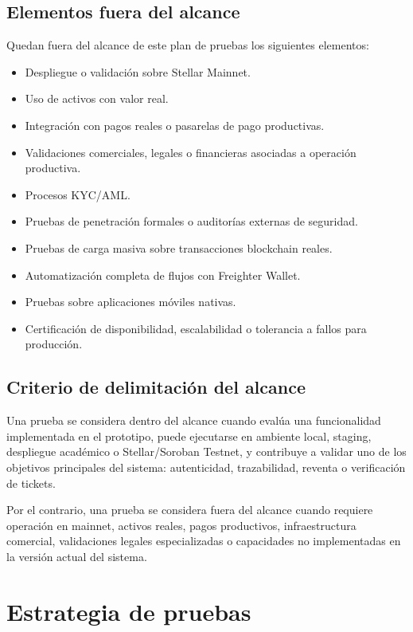 \documentclass[12pt,letterpaper]{article}
\begin{document}
\subsection{Elementos fuera del alcance}

Quedan fuera del alcance de este plan de pruebas los siguientes elementos:

\begin{itemize}
    \item Despliegue o validación sobre Stellar Mainnet.
    \item Uso de activos con valor real.
    \item Integración con pagos reales o pasarelas de pago productivas.
    \item Validaciones comerciales, legales o financieras asociadas a operación productiva.
    \item Procesos KYC/AML.
    \item Pruebas de penetración formales o auditorías externas de seguridad.
    \item Pruebas de carga masiva sobre transacciones blockchain reales.
    \item Automatización completa de flujos con Freighter Wallet.
    \item Pruebas sobre aplicaciones móviles nativas.
    \item Certificación de disponibilidad, escalabilidad o tolerancia a fallos para producción.
\end{itemize}

\subsection{Criterio de delimitación del alcance}

Una prueba se considera dentro del alcance cuando evalúa una funcionalidad implementada en el prototipo, puede ejecutarse en ambiente local, staging, despliegue académico o Stellar/Soroban Testnet, y contribuye a validar uno de los objetivos principales del sistema: autenticidad, trazabilidad, reventa o verificación de tickets.

Por el contrario, una prueba se considera fuera del alcance cuando requiere operación en mainnet, activos reales, pagos productivos, infraestructura comercial, validaciones legales especializadas o capacidades no implementadas en la versión actual del sistema.

\section{Estrategia de pruebas}
\end{document}
